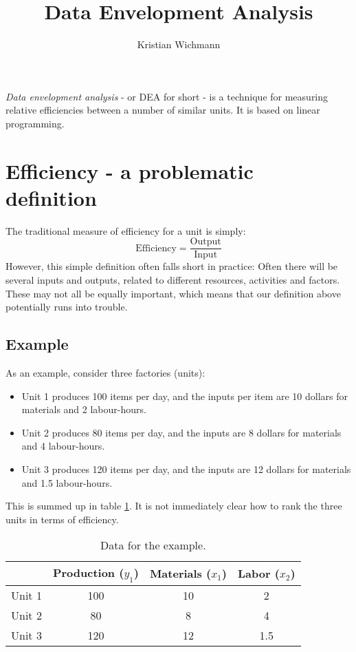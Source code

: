 \documentclass[12pt, a4paper]{article}
\title{Data Envelopment Analysis}
\author{Kristian Wichmann}
\numberwithin{equation}{section}
\begin{document}
\maketitle

\textit{Data envelopment analysis} - or DEA for short - is a technique for measuring relative efficiencies between a number of similar units. It is based on linear programming.

\section{Efficiency - a problematic definition}
The traditional measure of efficiency for a unit is simply:
\begin{equation}
\textrm{Efficiency}=\frac{\textrm{Output}}{\textrm{Input}}
\end{equation}
However, this simple definition often falls short in practice: Often there will be several inputs and outputs, related to different resources, activities and factors. These may not all be equally important, which means that our definition above potentially runs into trouble.

\subsection{Example}
As an example, consider three factories (units):
\begin{itemize}
\item Unit 1 produces 100 items per day, and the inputs per item are 10 dollars for materials and 2 labour-hours.
\item Unit 2 produces 80 items per day, and the inputs are 8 dollars for materials and 4 labour-hours.
\item Unit 3 produces 120 items per day, and the inputs are 12 dollars for materials and 1.5 labour-hours.
\end{itemize}
This is summed up in table \ref{table:example}. It is not immediately clear how to rank the three units in terms of efficiency.

\begin{table}
\centering
\label{table:example}
\begin{tabular}{l|c|c|c|}
\cline{2-4}
                             & \multicolumn{1}{l|}{Production ($y_1$)} & \multicolumn{1}{l|}{Materials ($x_1$)} & \multicolumn{1}{l|}{Labor ($x_2$)} \\ \hline
\multicolumn{1}{|l|}{Unit 1} & 100                             & 10                             & 2                          \\ \hline
\multicolumn{1}{|l|}{Unit 2} & 80                              & 8                              & 4                          \\ \hline
\multicolumn{1}{|l|}{Unit 3} & 120                             & 12                             & 1.5                        \\ \hline
\end{tabular}
\caption{Data for the example.}
\end{table}
\end{document}
